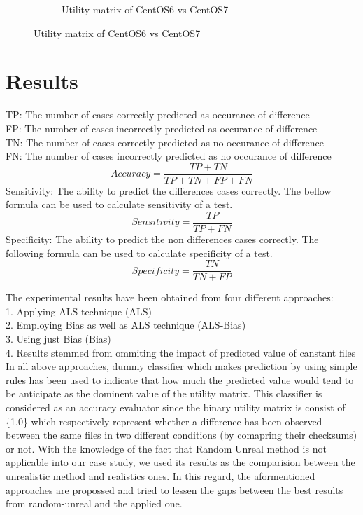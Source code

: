 \documentclass[10pt, conference, compsocconf]{IEEEtran}
\begin{document}
\begin{figure}
\begin{subfigure}[b]{0.5\linewidth}
  \caption{Utility matrix of CentOS6 vs CentOS7}
  \label{fig:utility metrices}
  \end{subfigure}
\end{figure}



\section{Results}

TP: The number of cases correctly predicted as occurance of difference \\
FP: The number of cases incorrectly predicted as occurance of difference \\
TN: The number of cases correctly predicted as no occurance of difference \\ 
FN: The number of cases incorrectly predicted as no occurance of difference \\
\[
	    Accuracy = \frac{TP+TN}{TP+TN+FP+FN}
\]
Sensitivity: The ability to predict the differences cases correctly. The bellow formula can be used to calculate sensitivity of a test.
\[
            Sensitivity = \frac{TP}{TP+FN}
\]
Specificity: The ability to predict the non differences cases correctly. The following formula can be used to calculate specificity of a test. 
\[
            Specificity = \frac{TN}{TN+FP}
\]

The experimental results have been obtained from four different approaches:\\
1. Applying ALS technique (ALS)\\
2. Employing Bias as well as ALS technique (ALS-Bias)\\
3. Using just Bias (Bias)\\
4. Results stemmed from ommiting the impact of predicted value of canstant files \\
In all above approaches, dummy classifier which makes prediction by using simple rules\cite{URL}
has been used to indicate that how much the predicted value would tend to be anticipate 
as the dominent value of the utility matrix. This classifier is considered as an 
accuracy evaluator since the binary utility matrix is consist of \{1,0\} which  
respectively represent whether a difference has been observed between the same files 
in two different conditions (by comapring their checksums) or not.
With the knowledge of the fact that Random Unreal method is not applicable into our 
case study, we used its results as the comparision between the unrealistic method 
and realistics ones. In this regard, the aformentioned approaches are propossed and 
tried to lessen the gaps between the best results from random-unreal and the applied one.
\end{document}
